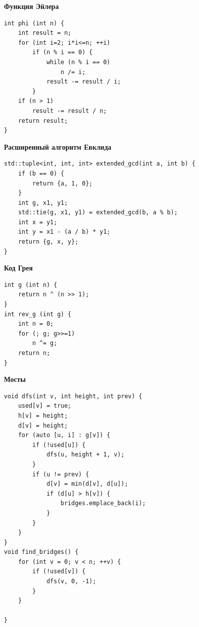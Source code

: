\documentclass[a4paper, 10pt]{article}
\begin{document}
{\Large \textbf{Функция Эйлера}}
\begin{lstlisting}
int phi (int n) {
	int result = n;
	for (int i=2; i*i<=n; ++i)
		if (n % i == 0) {
			while (n % i == 0)
				n /= i;
			result -= result / i;
		}
	if (n > 1)
		result -= result / n;
	return result;
}
\end{lstlisting}

{\Large \textbf{Расширенный алгоритм Евклида}}
\begin{lstlisting}
std::tuple<int, int, int> extended_gcd(int a, int b) {
    if (b == 0) {
        return {a, 1, 0};
    }
    int g, x1, y1;
    std::tie(g, x1, y1) = extended_gcd(b, a % b);
    int x = y1;
    int y = x1 - (a / b) * y1;
    return {g, x, y};
}
\end{lstlisting}

{\Large \textbf{Код Грея}}
\begin{lstlisting}
int g (int n) {
	return n ^ (n >> 1);
}
int rev_g (int g) {
	int n = 0;
	for (; g; g>>=1)
		n ^= g;
	return n;
}
\end{lstlisting}

{\Large \textbf{Мосты}}
\begin{lstlisting}
void dfs(int v, int height, int prev) {
    used[v] = true;
    h[v] = height;
    d[v] = height;
    for (auto [u, i] : g[v]) {
        if (!used[u]) {
            dfs(u, height + 1, v);
        }
        if (u != prev) {
            d[v] = min(d[v], d[u]);
            if (d[u] > h[v]) {
                bridges.emplace_back(i);
            }
        }
    }
}
void find_bridges() {
	for (int v = 0; v < n; ++v) {
        if (!used[v]) {
            dfs(v, 0, -1);
        }
    }

}
\end{lstlisting}
\end{document}
